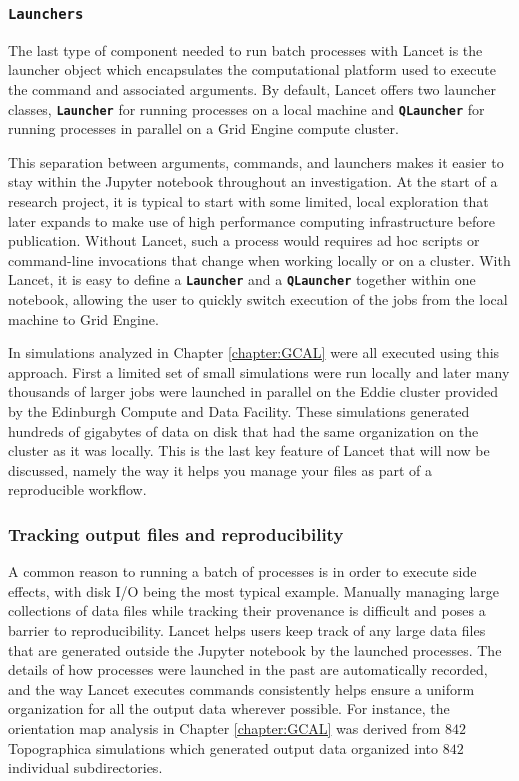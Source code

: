\documentclass[phd,ianc,twoside]{infthesis}
\newcommand{\tbf}[1]{\texttt{\textbf{#1}}}
\begin{document}
\subsubsection*{\tbf{Launchers}}

The last type of component needed to run batch processes with Lancet is
the launcher object which encapsulates the computational platform used
to execute the command and associated arguments. By default, Lancet
offers two launcher classes, \tbf{Launcher} for running processes on a
local machine and \tbf{QLauncher} for running processes in parallel on a
Grid Engine compute cluster.

This separation between arguments, commands, and launchers makes it
easier to stay within the Jupyter notebook throughout an
investigation. At the start of a research project, it is typical to
start with some limited, local exploration that later expands to make
use of high performance computing infrastructure before
publication. Without Lancet, such a process would requires ad hoc
scripts or command-line invocations that change when working locally or
on a cluster. With Lancet, it is easy to define a \tbf{Launcher} and a
\tbf{QLauncher} together within one notebook, allowing the user to
quickly switch execution of the jobs from the local machine to Grid
Engine.

In simulations analyzed in Chapter \ref{chapter:GCAL} were all executed
using this approach. First a limited set of small simulations were run
locally and later many thousands of larger jobs were launched in
parallel on the Eddie cluster provided by the Edinburgh Compute and Data
Facility. These simulations generated hundreds of gigabytes of data on
disk that had the same organization on the cluster as it was locally.
This is the last key feature of Lancet that will now be discussed,
namely the way it helps you manage your files as part of a reproducible
workflow.


\subsubsection*{Tracking output files and reproducibility}

A common reason to running a batch of processes is in order to execute
side effects, with disk I/O being the most typical example. Manually
managing large collections of data files while tracking their provenance
is difficult and poses a barrier to reproducibility. Lancet helps users
keep track of any large data files that are generated outside the
Jupyter notebook by the launched processes. The details of how processes
were launched in the past are automatically recorded, and the way Lancet
executes commands consistently helps ensure a uniform organization for
all the output data wherever possible. For instance, the orientation map
analysis in Chapter \ref{chapter:GCAL} was derived from $842$
Topographica simulations which generated output data organized into
$842$ individual subdirectories.
\end{document}
